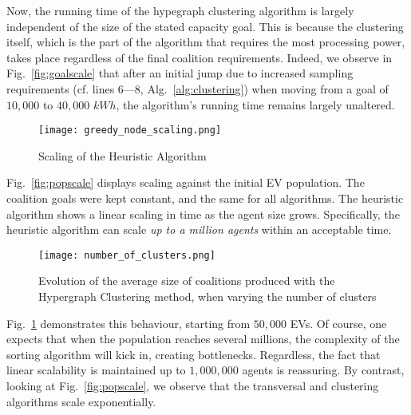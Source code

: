 Now, the running time of the hypegraph clustering algorithm is largely independent of the size of the stated capacity goal. 
This is because the clustering itself, which is the part of the algorithm that requires the most processing power, takes place regardless of the final coalition requirements.
Indeed, we observe in Fig.~\ref{fig:goalscale} that after an initial jump due to increased sampling requirements (cf. lines 6---8, Alg.~\ref{alg:clustering}) when moving from a goal of $10,000$ to $40,000$ $kWh$,
the algorithm's running time remains largely unaltered.
\begin{figure}
	\centering
	\texttt{[image: greedy\_node\_scaling.png]}
	\vspace{10pt}
	\caption{Scaling of the Heuristic Algorithm\label{fig:heuristicscaling}}
\end{figure}
Fig.~\ref{fig:popscale} %
displays scaling against the initial EV population. The coalition goals were kept constant, and the same for all algorithms.
The heuristic algorithm shows a linear scaling in time as the agent size grows. Specifically, the heuristic algorithm can scale {\em up to a million agents} within an acceptable time. 
\begin{figure}
	\centering
	\texttt{[image: number\_of\_clusters.png]}
	\vspace{10pt}
	\caption{Evolution of the average size of coalitions produced with the Hypergraph Clustering method, when varying the number of clusters\label{fig:clusterkscale}}
\end{figure}

Fig.~\ref{fig:heuristicscaling} demonstrates this behaviour, starting from $50,000$ EVs. Of course, one expects that when the population reaches several millions, the complexity of the sorting algorithm will kick in, creating bottlenecks. Regardless, the fact that linear scalability is maintained up to $1,000,000$ agents is reassuring. By contrast, looking at Fig.~\ref{fig:popscale}, we observe that the transversal and clustering algorithms scale exponentially.





